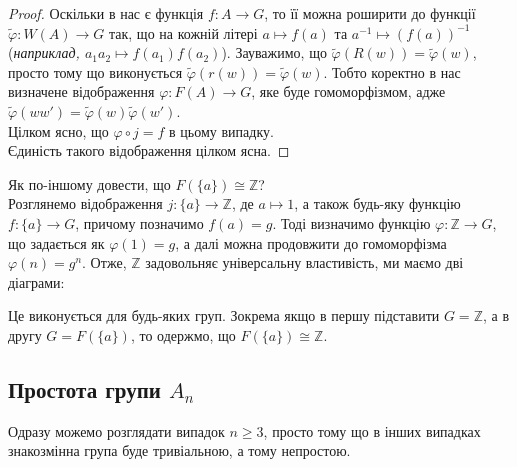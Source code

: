 \documentclass{math_library}
\begin{document}
\begin{proof}
Оскільки в нас є функція $f \colon A \to G$, то її можна роширити до функції $\tilde{\varphi} \colon W(A) \to G$ так, що на кожній літері $a \mapsto f(a)$ та $a^{-1} \mapsto (f(a))^{-1}$ (\textit{наприклад, $a_1 a_2 \mapsto f(a_1) f(a_2)$}). Зауважимо, що $\tilde{\varphi}(R(w)) = \tilde{\varphi}(w)$, просто тому що виконується $\tilde{\varphi}(r(w)) = \tilde{\varphi}(w)$. Тобто коректно в нас визначене відображення $\varphi \colon F(A) \to G$, яке буде гомоморфізмом, адже $\tilde{\varphi}(ww') = \tilde{\varphi}(w) \tilde{\varphi}(w')$.\\
Цілком ясно, що $\varphi \circ j = f$ в цьому випадку.
\bigskip \\
Єдиність такого відображення цілком ясна.
\end{proof}

\begin{example}
Як по-іншому довести, що $F(\{a\}) \cong \mathbb{Z}$?
\bigskip \\
Розглянемо відображення $j \colon \{a\} \to \mathbb{Z}$, де $a \mapsto 1$, а також будь-яку функцію $f \colon \{a\} \to G$, причому позначимо $f(a) = g$. Тоді визначимо функцію $\varphi \colon \mathbb{Z} \to G$, що задається як $\varphi(1) = g$, а далі можна продовжити до гомоморфізма $\varphi(n) = g^n$. Отже, $\mathbb{Z}$ задовольняє універсальну властивість, ми маємо дві діаграми:
\begin{figure}[H]
\centering
{}
\qquad
{}
\end{figure}
Це виконується для будь-яких груп. Зокрема якщо в першу підставити $G = \mathbb{Z}$, а в другу $G = F(\{a\})$, то одержмо, що $F(\{a\}) \cong \mathbb{Z}$.
\end{example}

\subsection{Простота групи $A_n$}
Одразу можемо розглядати випадок $n \geq 3$, просто тому що в інших випадках знакозмінна група буде тривіальною, а тому непростою.
\end{document}
